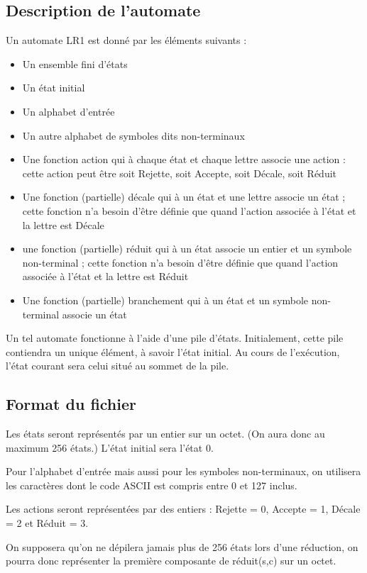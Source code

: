 \subsection{Description de l'automate}
Un automate LR1 est donné par les éléments suivants :
\begin{itemize}
	\item Un ensemble fini d'états
	\item Un état initial
	\item Un alphabet d'entrée
	\item Un autre alphabet de symboles dits non-terminaux
	\item Une fonction action qui à chaque état et chaque lettre associe une action : cette action peut être soit Rejette, soit Accepte, soit Décale, soit Réduit
	\item Une fonction (partielle) décale qui à un état et une lettre associe un état ; cette fonction n'a besoin d'être définie que quand l'action associée à l'état et la lettre est Décale
	\item une fonction (partielle) réduit qui à un état associe un entier et un symbole non-terminal ; cette fonction n'a besoin d'être définie que quand l'action associée à l'état et la lettre est Réduit
	\item Une fonction (partielle) branchement qui à un état et un symbole non-terminal associe un état
\end{itemize} 

Un tel automate fonctionne à l'aide d'une pile d'états. Initialement, cette pile contiendra un unique élément, à savoir l'état initial. Au cours de l'exécution, l'état courant sera celui situé au sommet de la pile.

\subsection{Format du fichier}

Les états seront représentés par un entier sur un octet. (On aura donc au maximum 256 états.) L'état initial sera l'état 0.

Pour l'alphabet d'entrée mais aussi pour les symboles non-terminaux, on utilisera les caractères dont le code ASCII est compris entre 0 et 127 inclus.

Les actions seront représentées par des entiers : Rejette = 0, Accepte = 1, Décale = 2 et Réduit = 3.

On supposera qu'on ne dépilera jamais plus de 256 états lors d'une réduction, on pourra donc représenter la première composante de réduit(s,c) sur un octet.

